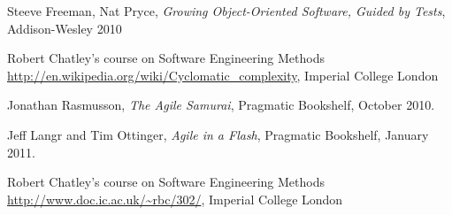\documentclass[10pt]{article}
\begin{document}
\begin{thebibliography}{9}
  Steeve Freeman, Nat Pryce,
  \emph{Growing Object-Oriented Software, Guided by Tests}, Addison-Wesley 2010

  Robert Chatley's course on Software Engineering Methods
  \url{http://en.wikipedia.org/wiki/Cyclomatic_complexity},
  Imperial College London

  Jonathan Rasmusson,
  \emph{The Agile Samurai},
  Pragmatic Bookshelf,
  October 2010.

  Jeff Langr and Tim Ottinger,
  \emph{Agile in a Flash},
  Pragmatic Bookshelf, 
  January 2011.

  Robert Chatley's course on Software Engineering Methods
  \url{http://www.doc.ic.ac.uk/~rbc/302/},
  Imperial College London

\end{thebibliography}
\end{document}
